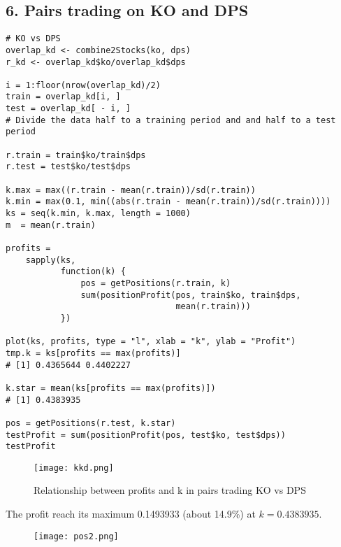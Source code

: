 \documentclass{article}
\begin{document}
\subsection*{6. Pairs trading on KO and DPS}
\begin{verbatim}
# KO vs DPS
overlap_kd <- combine2Stocks(ko, dps)
r_kd <- overlap_kd$ko/overlap_kd$dps

i = 1:floor(nrow(overlap_kd)/2)
train = overlap_kd[i, ]
test = overlap_kd[ - i, ]
# Divide the data half to a training period and and half to a test period

r.train = train$ko/train$dps
r.test = test$ko/test$dps

k.max = max((r.train - mean(r.train))/sd(r.train))
k.min = max(0.1, min((abs(r.train - mean(r.train))/sd(r.train))))
ks = seq(k.min, k.max, length = 1000)
m  = mean(r.train)

profits =
    sapply(ks,
           function(k) {
               pos = getPositions(r.train, k)
               sum(positionProfit(pos, train$ko, train$dps, 
                                  mean(r.train)))
           })

plot(ks, profits, type = "l", xlab = "k", ylab = "Profit")
tmp.k = ks[profits == max(profits)]  
# [1] 0.4365644 0.4402227

k.star = mean(ks[profits == max(profits)])
# [1] 0.4383935

pos = getPositions(r.test, k.star)
testProfit = sum(positionProfit(pos, test$ko, test$dps)) 
testProfit
\end{verbatim}

\begin{figure}[H] 
\begin{center} 
\texttt{[image: kkd.png]}  
\caption{Relationship between profits and k in pairs trading KO vs DPS} 
\end{center} 
\end{figure}
The profit reach its maximum 0.1493933 (about 14.9\%) at $k=0.4383935$.
\begin{figure}[H] 
\begin{center} 
\texttt{[image: pos2.png]}  
\end{center} 
\end{figure}
\end{document}
